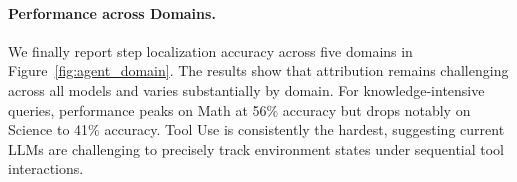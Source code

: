 \paragraph{Performance across Domains.}
We finally report step localization accuracy across five domains in Figure~\ref{fig:agent_domain}. The results show that attribution remains challenging across all models and varies substantially by domain. For knowledge-intensive queries, performance peaks on Math at 56\% accuracy but drops notably on Science to 41\% accuracy. Tool Use is consistently the hardest, suggesting current LLMs are challenging to precisely track environment states under sequential tool interactions.







